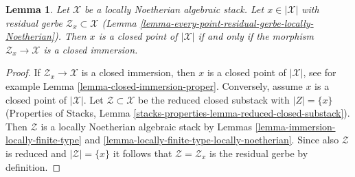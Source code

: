 \documentclass{stacks-project}
\theoremstyle{plain}
\newtheorem{lemma}[subsection]{Lemma}
\theoremstyle{definition}
\theoremstyle{remark}
\numberwithin{equation}{subsection}
\begin{document}
\begin{lemma}
\label{lemma-residual-space-closed}
Let $\mathcal{X}$ be a locally Noetherian algebraic stack.
Let $x \in |\mathcal{X}|$ with residual gerbe
$\mathcal{Z}_x \subset \mathcal{X}$
(Lemma \ref{lemma-every-point-residual-gerbe-locally-Noetherian}).
Then $x$ is a closed point of $|\mathcal{X}|$ if and only if
the morphism $\mathcal{Z}_x \to \mathcal{X}$ is a closed immersion.
\end{lemma}

\begin{proof}
If $\mathcal{Z}_x \to \mathcal{X}$ is a closed immersion, then
$x$ is a closed point of $|\mathcal{X}|$, see for example
Lemma \ref{lemma-closed-immersion-proper}.
Conversely, assume $x$ is a closed point of $|\mathcal{X}|$.
Let $\mathcal{Z} \subset \mathcal{X}$
be the reduced closed substack with $|Z| = \{x\}$
(Properties of Stacks,
Lemma \ref{stacks-properties-lemma-reduced-closed-substack}).
Then $\mathcal{Z}$ is a locally Noetherian algebraic stack
by Lemmas \ref{lemma-immersion-locally-finite-type} and
\ref{lemma-locally-finite-type-locally-noetherian}.
Since also $\mathcal{Z}$ is reduced and $|\mathcal{Z}| = \{x\}$
it follows that $\mathcal{Z} = \mathcal{Z}_x$ is the
residual gerbe by definition.
\end{proof}















\end{document}
